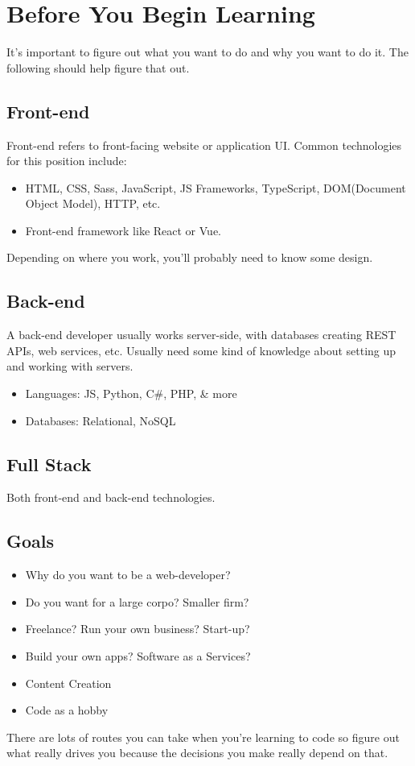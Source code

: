 \section{Before You Begin Learning}

It's important to figure out what you want to do and why you want to do it. The following should help figure that out.
\subsection*{Front-end}
Front-end refers to front-facing website or application UI. Common technologies for this position include: 

\begin{itemize}
    \item HTML, CSS, Sass, JavaScript, JS Frameworks, TypeScript, DOM(Document Object Model), HTTP, etc.
    \item  Front-end framework like React or Vue.
\end{itemize}


Depending on where you work, you'll probably need to know some design.

\subsection*{Back-end}
A back-end developer usually works server-side, with databases creating REST APIs, web services, etc. Usually need some kind of knowledge about setting up and working with servers. 
\begin{itemize}
    \item Languages: JS, Python, C\#, PHP, \& more
    \item Databases: Relational, NoSQL
\end{itemize}

\subsection*{Full Stack}
Both front-end and back-end technologies.

\subsection*{Goals}
\begin{itemize}
    \item Why do you want to be a web-developer?
    \item Do you want for a large corpo? Smaller firm? 
    \item Freelance? Run your own business? Start-up?
    \item Build your own apps? Software as a Services?
    \item Content Creation
    \item Code as a hobby
\end{itemize}

There are lots of routes you can take when you're learning to code so figure out what really drives you because the decisions you make really depend on that.